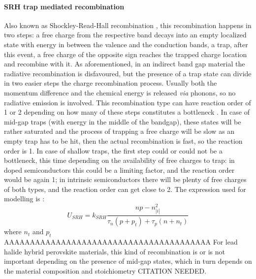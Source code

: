 		\paragraph{SRH trap mediated recombination}
		Also known as Shockley-Read-Hall recombination \cite{Shockley1952}, this recombination happens in two steps: a free charge from the respective band decays into an empty localized state with energy in between the valence and the conduction bands, a trap, after this event, a free charge of the opposite sign reaches the trapped charge location and recombine with it.
		As aforementioned, in an indirect band gap material the radiative recombination is disfavoured, but the presence of a trap state can divide in two easier steps the charge recombination process.
		Usually both the momentum difference and the chemical energy is released \textsl{via} phonons, so no radiative emission is involved.
		This recombination type can have reaction order of 1 or 2 depending on how many of these steps constitutes a bottleneck \cite{Calado2018b}.
		In case of mid-gap traps (with energy in the middle of the bandgap), these states will be rather saturated and the process of trapping a free charge will be slow as an empty trap has to be hit, then the actual recombination is fast, so the reaction order is 1.
		In case of shallow traps, the first step could or could not be a bottleneck, this time depending on the availability of free charges to trap: in doped semiconductors this could be a limiting factor, and the reaction order would be again 1; in intrinsic semiconductors there will be plenty of free charges of both types, and the reaction order can get close to 2.
		The expression used for modelling is \cite{Shockley1952}:
		\begin{equation}\label{eq:srh}
			U_{SRH} = k_{SRH} \frac{np-n_|i|^2}{\tau_n(p+p_t)+ \tau_p(n+n_t)}
		\end{equation}
		where $n_t$ and $p_t$ AAAAAAAAAAAAAAAAAAAAAAAAAAAAAAAAAAAAAAAA
		For lead halide hybrid perovskite materials, this kind of recombination is or is not important depending on the presence of mid-gap states, which in turn depends on the material composition and stoichiometry CITATION NEEDED.

